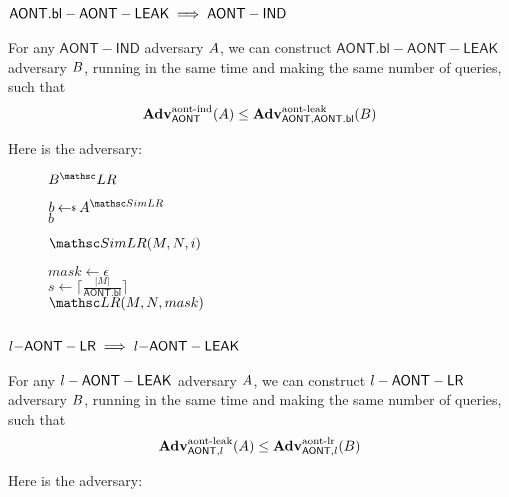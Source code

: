 \documentclass[11pt,twoside]{article}
\begin{document}
\subsection{$\mathsf{AONT.bl-AONT-LEAK}\implies\mathsf{AONT-IND}$}

\begin{theorem}
For any $\mathsf{AONT-IND}$ adversary $A$, we can construct $\mathsf{AONT.bl-AONT-LEAK}$ adversary $B$, running in the same time and making the same number of queries, such that $$\textbf{Adv}^\text{aont-ind}_{\mathsf{AONT}}(A)\le\textbf{Adv}^\text{aont-leak}_{\mathsf{AONT},\mathsf{AONT.bl}}(B)$$
\end{theorem}

Here is the adversary:

\begin{figure}[H]
{
\underline{$\advB^\LRO$}

\begin{algorithm}[H]
$b\getsr \advA^{\procfont{SimLR}}$\\
\Return $b$
\end{algorithm}

\underline{$\procfont{SimLR}(M,N,i)$}

\begin{algorithm}[H]
$mask\gets \epsilon$\\
$s\gets \lceil\frac{|M|}{\mathsf{AONT.bl}}\rceil$\\
{
}
\Return $\LRO(M,N,mask)$
\end{algorithm}
}
\end{figure}

\subsection{$l\mathsf{-AONT-LR}\implies l\mathsf{-AONT-LEAK}$}

\begin{theorem}
For any $l-\mathsf{AONT-LEAK}$ adversary $A$, we can construct $l-\mathsf{AONT-LR}$ adversary $B$, running in the same time and making the same number of queries, such that $$\textbf{Adv}^\text{aont-leak}_{\mathsf{AONT},l}(A)\le\textbf{Adv}^\text{aont-lr}_{\mathsf{AONT},l}(B)$$
\end{theorem}

Here is the adversary:
\end{document}
